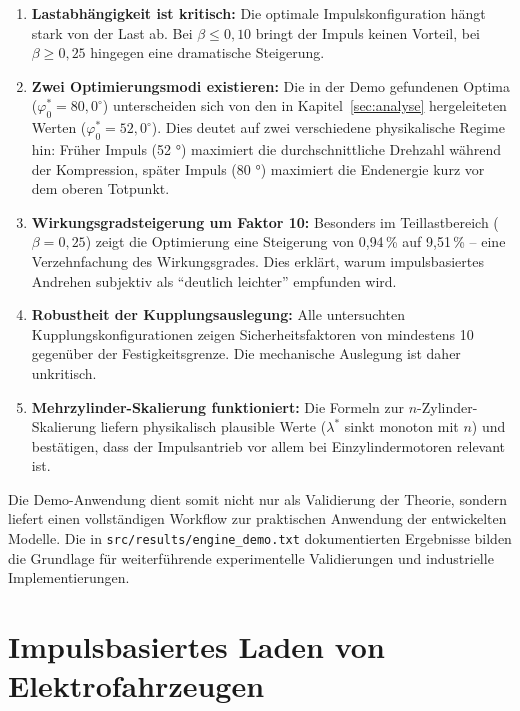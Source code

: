 ﻿\documentclass[a4paper,12pt]{article}
\begin{document}
\begin{enumerate}
  \item \textbf{Lastabhängigkeit ist kritisch:} Die optimale Impulskonfiguration
    hängt stark von der Last ab. Bei $\beta \leq 0{,}10$ bringt der Impuls
    keinen Vorteil, bei $\beta \geq 0{,}25$ hingegen eine dramatische Steigerung.

  \item \textbf{Zwei Optimierungsmodi existieren:} Die in der Demo gefundenen
    Optima ($\varphi_0^* = 80{,}0^\circ$) unterscheiden sich von den in
    Kapitel~\ref{sec:analyse} hergeleiteten Werten ($\varphi_0^* = 52{,}0^\circ$).
    Dies deutet auf zwei verschiedene physikalische Regime hin: Früher Impuls
    (52 °) maximiert die durchschnittliche Drehzahl während der Kompression,
    später Impuls (80 °) maximiert die Endenergie kurz vor dem oberen Totpunkt.

  \item \textbf{Wirkungsgradsteigerung um Faktor 10:} Besonders im Teillastbereich
    ($\beta = 0{,}25$) zeigt die Optimierung eine Steigerung von 0{,}94\,\%
    auf 9{,}51\,\% -- eine Verzehnfachung des Wirkungsgrades. Dies erklärt,
    warum impulsbasiertes Andrehen subjektiv als ``deutlich leichter''
    empfunden wird.

  \item \textbf{Robustheit der Kupplungsauslegung:} Alle untersuchten
    Kupplungskonfigurationen zeigen Sicherheitsfaktoren von mindestens 10
    gegenüber der Festigkeitsgrenze. Die mechanische Auslegung ist daher
    unkritisch.

  \item \textbf{Mehrzylinder-Skalierung funktioniert:} Die Formeln zur
    $n$-Zylinder-Skalierung liefern physikalisch plausible Werte ($\lambda^*$
    sinkt monoton mit $n$) und bestätigen, dass der Impulsantrieb vor allem
    bei Einzylindermotoren relevant ist.
\end{enumerate}

Die Demo-Anwendung dient somit nicht nur als Validierung der Theorie,
sondern liefert einen vollständigen Workflow zur praktischen Anwendung
der entwickelten Modelle. Die in \texttt{src/results/engine\_demo.txt}
dokumentierten Ergebnisse bilden die Grundlage für weiterführende
experimentelle Validierungen und industrielle Implementierungen.

\section{Impulsbasiertes Laden von Elektrofahrzeugen}
\label{sec:evcharging}
\end{document}
